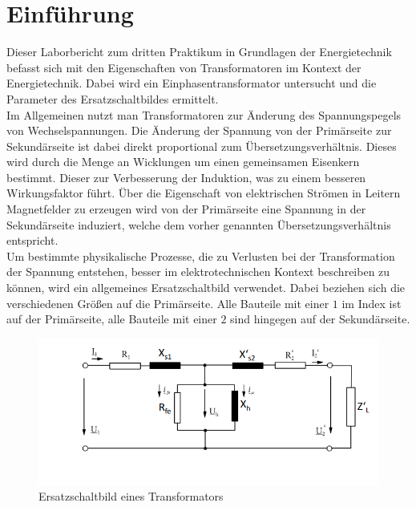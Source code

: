 \documentclass{article}
\begin{document}
\newpage


\tableofcontents

\listoffigures

\listoftables


\newpage

\section{Einführung}

Dieser Laborbericht zum dritten Praktikum in Grundlagen der Energietechnik befasst sich  mit den Eigenschaften von Transformatoren im Kontext der Energietechnik. Dabei wird ein Einphasentransformator untersucht und die Parameter des Ersatzschaltbildes ermittelt.\\


\noindent
Im Allgemeinen nutzt man Transformatoren zur Änderung des Spannungspegels von Wechselspannungen. Die Änderung der Spannung von der Primärseite zur Sekundärseite ist dabei direkt proportional zum Übersetzungsverhältnis. Dieses wird durch die Menge an Wicklungen um einen gemeinsamen Eisenkern bestimmt. Dieser zur Verbesserung der Induktion, was zu einem besseren Wirkungsfaktor führt. Über die Eigenschaft von elektrischen Strömen in Leitern Magnetfelder zu erzeugen wird von der Primärseite eine Spannung in der Sekundärseite induziert, welche dem vorher genannten Übersetzungsverhältnis entspricht.\\

\noindent
Um bestimmte physikalische Prozesse, die zu Verlusten bei der Transformation der Spannung entstehen, besser im elektrotechnischen Kontext beschreiben zu können, wird ein allgemeines Ersatzschaltbild verwendet. Dabei beziehen sich die verschiedenen Größen auf die Primärseite. Alle Bauteile mit einer $1$ im Index ist auf der Primärseite, alle Bauteile mit einer $2$ sind hingegen auf der Sekundärseite.

\begin{figure}[h]
  \centering
  \includegraphics[width=\textwidth]{../assets/images/gep3/esb.png}
  \caption{Ersatzschaltbild eines Transformators}
  \label{fig:esbtrafo}
\end{figure}
\end{document}
